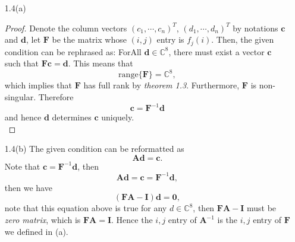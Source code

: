 \begin{enumerate}
    \item[1.4(a)] {
    \begin{proof}
    Denote the column vectors $(c_1, \cdots, c_n)^{T}$, $(d_1, \cdots, d_n)^{T}$ by notations $\bm{c}$ and $\bm{d}$, let $\bm{F}$ be the matrix whose $(i,j)$ entry is $f_j(i)$. Then, the given condition can be rephrased as: ForAll $\bm{d} \in \mathbb{C}^8$, there must exist a vector $\bm{c}$ such that $\bm{F} \bm{c} = \bm{d}$. This means that 
    $$
    \mathrm{range} \{\bm{F} \} = \mathbb{C}^8, 
    $$ 
    which implies that $\bm{F}$ has full rank by \textit{theorem 1.3}. Furthermore, $\mathbf{F}$ is non-singular. Therefore
    \[ \bm{c} = \bm{F}^{-1} \bm{d}\]
    and hence $\bm{d}$ determines $\bm{c}$ uniquely.\\
    \end{proof}
    }
    \item[1.4(b)]{
    The given condition can be reformatted as
    $$
    \bm{A} \bm{d} = \bm{c}.
    $$
    Note that $\bm{c} = \bm{F}^{-1} \bm{d}$, then 
    $$
    \bm{A} \bm{d}  = \bm{c} = \bm{F}^{-1} \bm{d},
    $$
    then we have
    $$
    (\bm{FA} - \bm{I})\bm{d } = \bm{0}, 
    $$
    note that this equation above is true for any $d \in \mathbb{C}^{8}$, then $\bm{FA} - \bm{I}$ must be \textit{zero matrix}, which is $\bm{FA} = \bm{I}$. Hence the $i,j$ entry of $\bm{A}^{-1}$ is the $i,j$ entry of $\bm{F}$ we defined in (a).
    }
\end{enumerate}